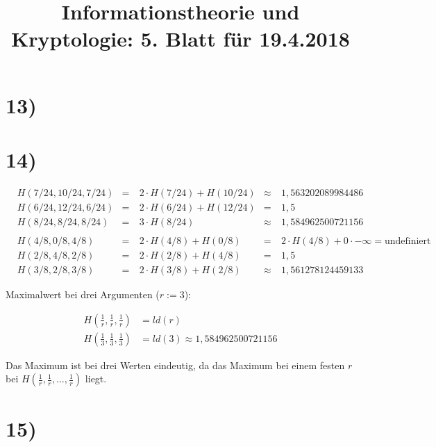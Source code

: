 %



  \title{Informationstheorie und Kryptologie: 5. Blatt für 19.4.2018}
  \maketitle

  \section*{13)}

  

  \section*{14)}

  \begin{align*}
    & H(7/24, 10/24, 7/24) &=\ &2 \cdot H(7/24) + H(10/24) &\approx&\ 1,563202089984486 \\
    & H(6/24, 12/24, 6/24) &=\ &2 \cdot H(6/24) + H(12/24) &=&\       1,5 \\
    & H(8/24, 8/24, 8/24)  &=\ &3 \cdot H(8/24)            &\approx&\ 1,584962500721156
    \\
    \\
    & H(4/8, 0/8, 4/8) &=\ &2 \cdot H(4/8) + H(0/8)        &=&\       2 \cdot H(4/8) + 0 \cdot -\infty = \text{undefiniert} \\
    & H(2/8, 4/8, 2/8) &=\ &2 \cdot H(2/8) + H(4/8)        &=&\       1,5 \\
    & H(3/8, 2/8, 3/8) &=\ &2 \cdot H(3/8) + H(2/8)        &\approx&\ 1,561278124459133
  \end{align*}

  Maximalwert bei drei Argumenten ($r := 3$):

  \begin{align*}
    H(\frac{1}{r}, \frac{1}{r}, \frac{1}{r}) &= ld(r) \\
    H(\frac{1}{3}, \frac{1}{3}, \frac{1}{3}) &= ld(3) \approx 1,584962500721156
  \end{align*}

  Das Maximum ist bei drei Werten eindeutig, da das Maximum bei einem festen $r$ bei $H(\frac{1}{r},\frac{1}{r},\dots,\frac{1}{r})$ liegt.

  \section*{15)}


